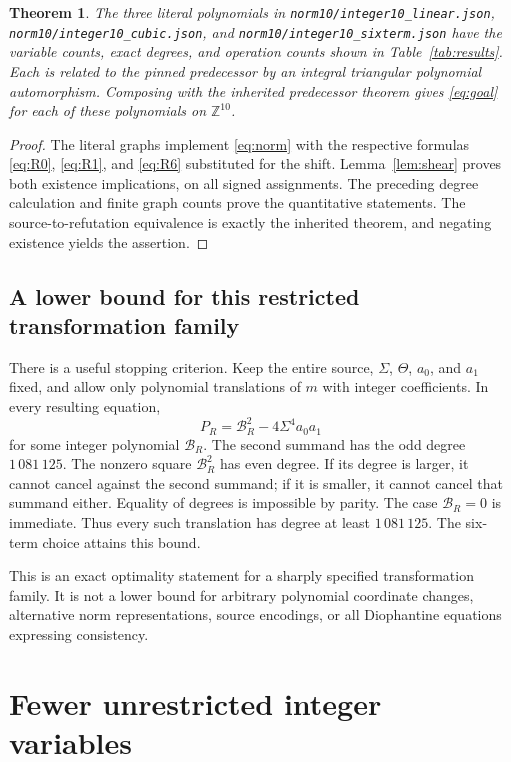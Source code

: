 \documentclass[11pt]{article}
\newtheorem{theorem}{Theorem}[section]
\theoremstyle{definition}
\theoremstyle{remark}
\newcommand{\Z}{\mathbb Z}
\newcommand{\file}[1]{\nolinkurl{#1}}
\begin{document}
\begin{theorem}\label{thm:ten}
The three literal polynomials in
\file{norm10/integer10_linear.json},
\file{norm10/integer10_cubic.json}, and
\file{norm10/integer10_sixterm.json} have the variable counts, exact degrees,
and operation counts shown in Table~\ref{tab:results}. Each is related to
the pinned predecessor by an integral triangular polynomial automorphism.
Composing with the inherited predecessor theorem gives \eqref{eq:goal}
for each of these polynomials on $\Z^{10}$.
\end{theorem}
\begin{proof}
The literal graphs implement \eqref{eq:norm} with the respective formulas
\eqref{eq:R0}, \eqref{eq:R1}, and \eqref{eq:R6} substituted for the shift.
Lemma~\ref{lem:shear} proves both existence implications, on all signed
assignments. The preceding degree calculation and finite graph counts prove
the quantitative statements. The source-to-refutation equivalence is
exactly the inherited theorem, and negating existence yields the assertion.
\end{proof}

\subsection{A lower bound for this restricted transformation family}

There is a useful stopping criterion. Keep the entire source, $\Sigma$,
$\Theta$, $a_0$, and $a_1$ fixed, and allow only polynomial translations of
$m$ with integer coefficients. In every resulting equation,
\[
 P_R=\mathcal B_R^2-4\Sigma^4a_0a_1
\]
for some integer polynomial $\mathcal B_R$. The second summand has the
odd degree $1\,081\,125$. The nonzero square $\mathcal B_R^2$ has even
degree. If its degree is larger, it cannot cancel against the second
summand; if it is smaller, it cannot cancel that summand either. Equality
of degrees is impossible by parity. The case $\mathcal B_R=0$ is immediate.
Thus every such translation has degree at least $1\,081\,125$.
The six-term choice attains this bound.

This is an exact optimality statement for a sharply specified transformation
family. It is not a lower bound for arbitrary polynomial coordinate
changes, alternative norm representations, source encodings, or all
Diophantine equations expressing consistency.

\section{Fewer unrestricted integer variables}
\label{sec:integer}

\end{document}
